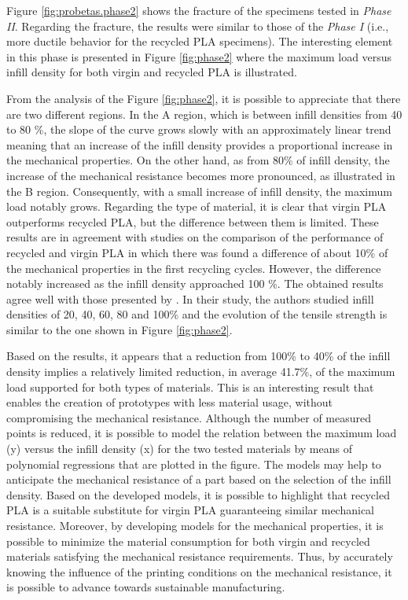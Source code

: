 \documentclass[]{interact}
\theoremstyle{plain}%
\theoremstyle{definition}
\theoremstyle{remark}
\begin{document}
Figure \ref{fig:probetas.phase2} shows the fracture of the specimens
tested in \emph{Phase II}. Regarding the fracture, the results were
similar to those of the \emph{Phase I} (i.e., more ductile behavior for
the recycled PLA specimens). The interesting element in this phase is
presented in Figure \ref{fig:phase2} where the maximum load versus
infill density for both virgin and recycled PLA is illustrated.

From the analysis of the Figure \ref{fig:phase2}, it is possible to
appreciate that there are two different regions. In the A region, which
is between infill densities from 40 to 80 \%, the slope of the curve
grows slowly with an approximately linear trend meaning that an increase
of the infill density provides a proportional increase in the mechanical
properties. On the other hand, as from 80\% of infill density, the
increase of the mechanical resistance becomes more pronounced, as
illustrated in the B region. Consequently, with a small increase of
infill density, the maximum load notably grows. Regarding the type of
material, it is clear that virgin PLA outperforms recycled PLA, but the
difference between them is limited. These results are in agreement with
studies on the comparison of the performance of recycled and virgin PLA
\citep{CruzSanchez2017} in which there was found a difference of about
10\% of the mechanical properties in the first recycling cycles.
However, the difference notably increased as the infill density
approached 100 \%. The obtained results agree well with those presented
by \citet{Wang2020h}. In their study, the authors studied infill
densities of 20, 40, 60, 80 and 100\% and the evolution of the tensile
strength is similar to the one shown in Figure \ref{fig:phase2}.

Based on the results, it appears that a reduction from 100\% to 40\% of
the infill density implies a relatively limited reduction, in average
41.7\%, of the maximum load supported for both types of materials. This
is an interesting result that enables the creation of prototypes with
less material usage, without compromising the mechanical resistance.
Although the number of measured points is reduced, it is possible to
model the relation between the maximum load (y) versus the infill
density (x) for the two tested materials by means of polynomial
regressions that are plotted in the figure. The models may help to
anticipate the mechanical resistance of a part based on the selection of
the infill density. Based on the developed models, it is possible to
highlight that recycled PLA is a suitable substitute for virgin PLA
guaranteeing similar mechanical resistance. Moreover, by developing
models for the mechanical properties, it is possible to minimize the
material consumption for both virgin and recycled materials satisfying
the mechanical resistance requirements. Thus, by accurately knowing the
influence of the printing conditions on the mechanical resistance, it is
possible to advance towards sustainable manufacturing.
\end{document}
